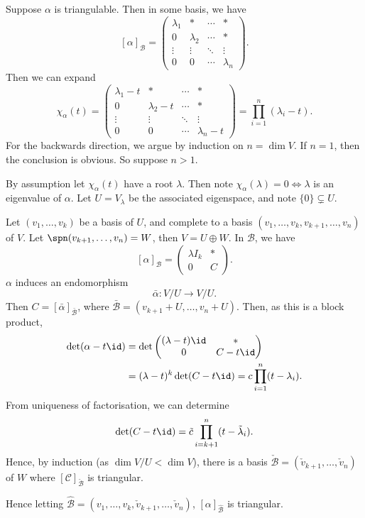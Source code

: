 \documentclass[12pt]{article}
\begin{document}
\begin{proofbox}
	Suppose $\alpha$ is triangulable. Then in some basis, we have
	\[
		[\alpha]_{\mathcal{B}}=
		\begin{pmatrix}
			\lambda_1 & \ast & \cdots & \ast \\
			0 & \lambda_2 & \cdots & \ast \\
			\vdots & \vdots & \ddots & \vdots \\
			0 & 0 & \cdots & \lambda_n
		\end{pmatrix}
	.\]
	Then we can expand
	 \[
		 \chi_{\alpha}(t) =
			\begin{pmatrix}
				\lambda_1 - t & \ast & \cdots & \ast \\
				0 & \lambda_2 - t & \cdots & \ast \\
				\vdots & \vdots & \ddots & \vdots \\
				0 & 0 & \cdots & \lambda_n - t
			\end{pmatrix}
			= \prod_{i = 1}^{n}(\lambda_i - t)
	.\]
	For the backwards direction, we argue by induction on $n = \dim V$. If $n = 1$, then the conclusion is obvious. So suppose $n > 1$.

	By assumption let $\chi_{\alpha}(t)$ have a root $\lambda$. Then note $\chi_{\alpha}(\lambda) = 0 \iff \lambda$ is an eigenvalue of $\alpha$. Let $U=  V_{\lambda}$ be the associated eigenspace, and note $\{0\} \subsetneq U$.

		Let $(v_1, \ldots, v_k)$ be a basis of $U$, and complete to a basis $(v_1, \ldots, v_k, v_{k+1}, \ldots, v_n)$ of $V$. Let $\spn(v_{k+1}, \ldots, v_n) = W$, then $V = U \oplus W$. In $\mathcal{B}$, we have
		\[
			[\alpha]_{\mathcal{B}} =
			\begin{pmatrix}
				\lambda I_k & \ast \\
				0 & C
			\end{pmatrix}
		.\]
		$\alpha$ induces an endomorphism
		\[
		\bar \alpha : V / U \to V/U
		.\]
		Then $C = [\bar \alpha]_{\bar{\mathcal{B}}}$, where $\bar{\mathcal{B}} = (v_{k+1} + U, \ldots, v_n + U)$. Then, as this is a block product,
		\begin{align*}
			\det(\alpha - t \id) &= \det
			\begin{pmatrix}
				(\lambda - t)\id & \ast \\
				0 & C - t \id
			\end{pmatrix}
			\\
					     &= (\lambda-t)^{k}\det(C - t\id) = c \prod_{i= 1}^{n} (t - \lambda_i).
		\end{align*}
		From uniqueness of factorisation, we can determine
		\[
			\det(C - t \id) = \tilde c \prod_{i = k+1}^{n} (t - \tilde \lambda_i)
		.\]
		Hence, by induction (as $\dim V/U < \dim V$), there is a basis $\check{\mathcal{B}} = (\check{v}_{k+1}, \ldots, \check v_{n})$ of $W$ where $[\mathcal{C}]_{\check{\mathcal{B}}}$ is triangular.

		Hence letting $\hat{\mathcal{B}} = (v_1, \ldots, v_k, \check v_{k+1}, \ldots, \check v_n)$, $[\alpha]_{\hat{\mathcal{B}}}$ is triangular.
\end{proofbox}
\end{document}
